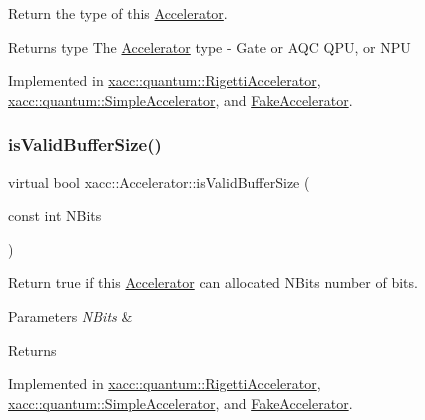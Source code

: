 Return the type of this \hyperlink{a02432}{Accelerator}.

\begin{DoxyReturn}{Returns}
type The \hyperlink{a02432}{Accelerator} type -\/ Gate or A\+QC Q\+PU, or N\+PU 
\end{DoxyReturn}


Implemented in \hyperlink{a01212_aab0d4674da5273d55407b9ab77cde890}{xacc\+::quantum\+::\+Rigetti\+Accelerator}, \hyperlink{a01244_ad76eeb0bbd7de21aad5bd20d20970a98}{xacc\+::quantum\+::\+Simple\+Accelerator}, and \hyperlink{a02496_abde88dbbf4410bf1c2c3826999e32d47}{Fake\+Accelerator}.

\mbox{\label{a02432_ae51584850faeec77299058383977ddeb}} 
\subsubsection{\texorpdfstring{is\+Valid\+Buffer\+Size()}{isValidBufferSize()}}
{\footnotesize\ttfamily virtual bool xacc\+::\+Accelerator\+::is\+Valid\+Buffer\+Size (\begin{DoxyParamCaption}\item[{const int}]{N\+Bits }\end{DoxyParamCaption})\hspace{0.3cm}{\ttfamily [pure virtual]}}

Return true if this \hyperlink{a02432}{Accelerator} can allocated N\+Bits number of bits. 
\begin{DoxyParams}{Parameters}
{\em N\+Bits} & \\
\hline
\end{DoxyParams}
\begin{DoxyReturn}{Returns}

\end{DoxyReturn}


Implemented in \hyperlink{a01212_a61352c07062597aad2393fbeed4cc025}{xacc\+::quantum\+::\+Rigetti\+Accelerator}, \hyperlink{a01244_a60b9db2d6aed235857c45413a070338e}{xacc\+::quantum\+::\+Simple\+Accelerator}, and \hyperlink{a02496_a7a6e63d282dc38fc53c3f3d46ca2ba9b}{Fake\+Accelerator}.

\mbox{\label{a02432_ac3e781f42ec25e460174d4c41ea26b94}} 
